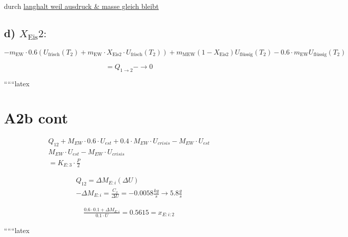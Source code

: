 \noindent
durch \underline{langhalt weil ausdruck \& masse gleich bleibt}

\subsection*{d) $X_{\text{Eis}} 2:$}

\[
- m_{\text{EW}} \cdot 0.6 \left( U_{\text{frisch}} (T_2) + m_{\text{EW}} \cdot X_{\text{Eis}2} \cdot U_{\text{frisch}} (T_2) \right) + m_{\text{MEW}} (1 - X_{\text{Eis}2}) U_{\text{flüssig}} (T_2) - 0.6 \cdot m_{\text{EW}} U_{\text{flüssig}} (T_2)
\]

\[
= Q_{1 \rightarrow 2} - \rightarrow 0
\]

``````latex


\section*{A2b cont}

\begin{align*}
Q_{12} + M_{EW} \cdot 0.6 \cdot U_{est} + 0.4 \cdot M_{EW} \cdot U_{crisis} - M_{EW} \cdot U_{est} \\
M_{EW} \cdot U_{est} - M_{EW} \cdot U_{crisis} \\
= K_{E:3} \cdot \frac{P}{2}
\end{align*}

\begin{align*}
Q_{12} = \Delta M_{E:i} \left( \Delta U \right) \\
-\Delta M_{E:i} = \frac{C_{x}}{\Delta U} = -0.0058 \frac{kg}{s} \rightarrow 5.8 \frac{g}{s}
\end{align*}

\begin{align*}
\frac{0.6 \cdot 0.1 + \Delta M_{E:i}}{0.1 \cdot U} = 0.5615 = x_{E:i:2}
\end{align*}

``````latex